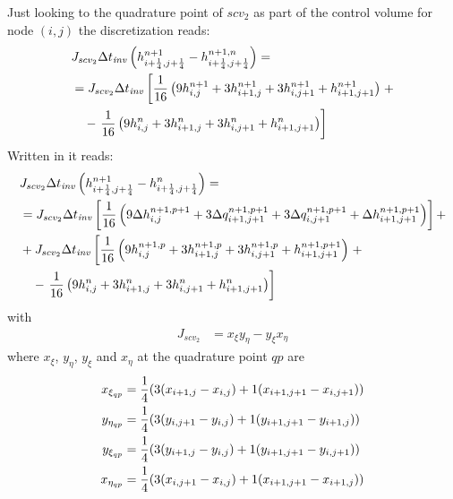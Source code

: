 Just looking to the quadrature point of $scv_2$ as part of the control volume for node $(i,j)$ the discretization reads:
\begin{align}
    &J_{scv_2}\Delta t_{\it{inv}} \left( h^{n+1}_{i+\frac{1}{4}, j+\frac{1}{4}} -  h^{n+1,n}_{i+\frac{1}{4}, j+\frac{1}{4}} \right) =
    \\*
    &= J_{scv_2}\Delta t_{\it{inv}} \left[ \frac{1}{16}\left( 9h^{n+1}_{i, j} + 3 h^{n+1}_{i+1,j}  + 3  h^{n+1}_{i, j+1} + h^{n+1}_{i+1, j+1}\right) \right. +
    \\*
    &\quad - \left. \frac{1}{16}\left( 9 h^{n}_{i, j} +  3 h^{n}_{i+1,j}  + 3  h^{n}_{i, j+1} + h^{n}_{i+1, j+1}\right)\right]
\end{align}
Written in \deltaformulation  it reads:
\begin{align}
    &J_{scv_2}\Delta t_{\it{inv}} \left( h^{n+1}_{i+\frac{1}{4}, j+\frac{1}{4}} -  h^{n}_{i+\frac{1}{4}, j+\frac{1}{4}} \right) =
    \nonumber \\*
    &=J_{scv_2}\Delta t_{\it{inv}} \left[ \frac{1}{16}\left( 9 \Delta h^{n+1,p+1}_{i, j} + 3 \Delta q^{n+1,p+1}_{i+1,j+1}  + 3 \Delta q^{n+1,p+1}_{i, j+1} + \Delta h^{n+1,p+1}_{i+1, j+1}\right) \right] +
    \nonumber \\*
    & + J_{scv_2}\Delta t_{\it{inv}} \left[ \frac{1}{16}\left( 9 h^{n+1,p}_{i, j} + 3 h^{n+1,p}_{i+1,j}  + 3 h^{n+1,p}_{i, j+1} + h^{n+1,p+1}_{i+1, j+1}\right) \right. +
    \nonumber \\*
    &\quad - \left. \frac{1}{16}\left( 9h^{n}_{i, j} +  3 h^{n}_{i+1,j}  + 3  h^{n}_{i, j+1} + h^{n}_{i+1, j+1}\right)\right]
\end{align}
with
\begin{align}
    J_{scv_2} &= x_\xi y_\eta - y_\xi x_\eta
\end{align}
where $x_\xi$, $y_\eta$, $y_\xi$ and $x_\eta$ at the quadrature point $qp$ are
\begin{align}
    x_{\xi_{qp}}  & = \frac{1}{4} ( 3 (x_{i+1,j} - x_{i,j}) + 1 (x_{i+1,j+1} - x_{i,j+1}) )
    \label{eq:scv2_dx_dxi}
    \\
    y_{\eta_{qp}} & = \frac{1}{4} ( 3 (y_{i,j+1} - y_{i,j}) + 1 (y_{i+1,j+1} - y_{i+1,j}) )
    \label{eq:scv2_dy_deta}
    \\
    y_{\xi_{qp}}  & = \frac{1}{4} ( 3 (y_{i+1,j} - y_{i,j}) + 1 (y_{i+1,j+1} - y_{i,j+1}) )
    \label{eq:scv2_dy_dxi}
    \\
    x_{\eta_{qp}} & = \frac{1}{4} ( 3 (x_{i,j+1} - x_{i,j}) + 1 (x_{i+1,j+1} - x_{i+1,j})  )
    \label{eq:scv2_dx_deta}
\end{align}

